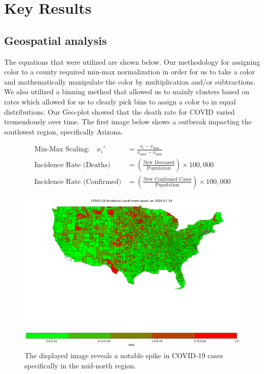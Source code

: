 \documentclass[sigconf,screen,nonacm]{acmart}
\begin{document}
\section{Key Results}


\subsection{Geospatial analysis}
The equations that were utilized are shown below. Our methodology for assigning color to a county required min-max normalization in order for us to take a color and mathematically manipulate the color by multiplication and/or subtractions. We also utilized a binning method that allowed us to mainly clusters based on rates which allowed for us to clearly pick bins to assign a color to in equal distributions. Our Geo-plot showed that the death rate for COVID varied tremendously over time. The first image below shows a outbreak impacting the southwest region, specifically Arizona.

{
\begin{align*}
\text{Min-Max Scaling:} \quad x_i' &= \frac{x_i - x_{\text{min}}}{x_{\text{max}} - x_{\text{min}}} \\
\text{Incidence Rate (Deaths)} &= \left(\frac{\text{New Deceased}}{\text{Population}}\right) \times 100,000 \\
\text{Incidence Rate (Confirmed)} &= \left(\frac{\text{New Confirmed Cases}}{\text{Population}}\right) \times 100,000
\end{align*}
}
\begin{figure}[h]
  \centering
  \includegraphics[width=1\linewidth]{Figures/IncidenceRate_covidCases2020-11-19.png}
  \caption{The displayed image reveals a notable spike in COVID-19 cases specifically in the mid-north region.}
\end{figure}
\end{document}
